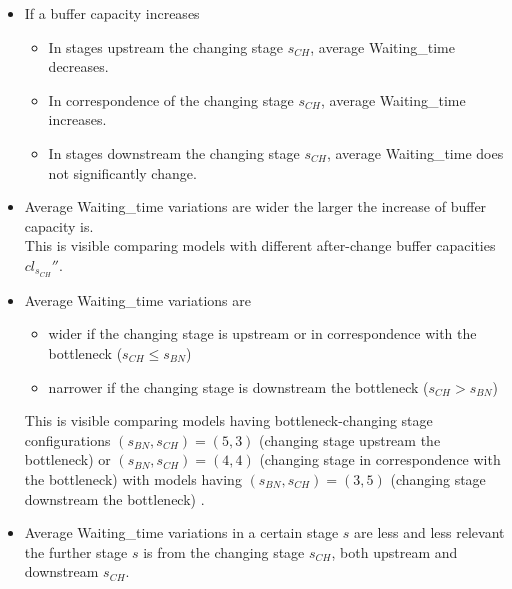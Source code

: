 \begin{itemize}
\item If a buffer capacity increases
\begin{itemize}
\item In stages upstream the changing stage $s_{CH}$, average Waiting\_time decreases.
\item In correspondence of the changing stage $s_{CH}$, average Waiting\_time increases.
\item In stages downstream the changing stage $s_{CH}$, average Waiting\_time does not significantly change.
\end{itemize}
\item Average Waiting\_time variations are wider the larger the increase of buffer capacity is. \\This is visible comparing models with different after-change buffer capacities $cl_{s_{CH}}''$. 
\item Average Waiting\_time variations are 
\begin{itemize}
\item wider if the changing stage is upstream or in correspondence with the bottleneck ($s_{CH} \leqslant s_{BN}$)
\item narrower if the changing stage is downstream the bottleneck ($s_{CH}>s_{BN}$)
\end{itemize}
This is visible comparing models having bottleneck-changing stage configurations $(s_{BN},s_{CH})=(5,3)$ (changing stage upstream the bottleneck) or $(s_{BN},s_{CH})=(4,4)$ (changing stage in correspondence with the bottleneck) with models having $(s_{BN},s_{CH})=(3,5)$ (changing stage downstream the bottleneck) . 
\item Average Waiting\_time variations in a certain stage $s$ are less and less relevant the further stage $s$ is from the changing stage $s_{CH}$, both upstream and downstream $s_{CH}$. 
\end{itemize}
